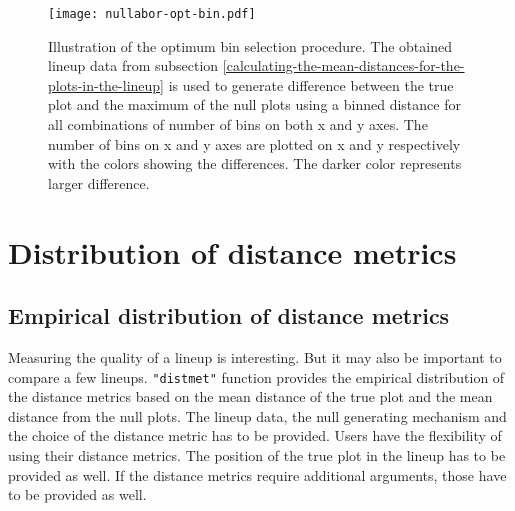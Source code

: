 \begin{figure*}[hbtp]
\begin{center}
\texttt{[image: nullabor-opt-bin.pdf]}
\caption{Illustration of the optimum bin selection procedure. The obtained lineup data from subsection \ref{calculating-the-mean-distances-for-the-plots-in-the-lineup} is used to generate difference between the true plot and the maximum of the null plots using a binned distance for all combinations of number of bins on both x and y axes. The number of bins on x and y axes are plotted on x and y respectively with the colors showing the differences. The darker color represents larger difference. }
\label{opt-bin}
\end{center}
\end{figure*}

\section{Distribution of distance metrics}\label{distr}

\subsection{Empirical distribution of distance
metrics}\label{distribution-of-distance-metrics}

Measuring the quality of a lineup is interesting. But it may also be
important to compare a few lineups. \texttt{"distmet"} function provides
the empirical distribution of the distance metrics based on the mean
distance of the true plot and the mean distance from the null plots. The
lineup data, the null generating mechanism and the choice of the
distance metric has to be provided. Users have the flexibility of using
their distance metrics. The position of the true plot in the lineup has
to be provided as well. If the distance metrics require additional
arguments, those have to be provided as well.

%
%

